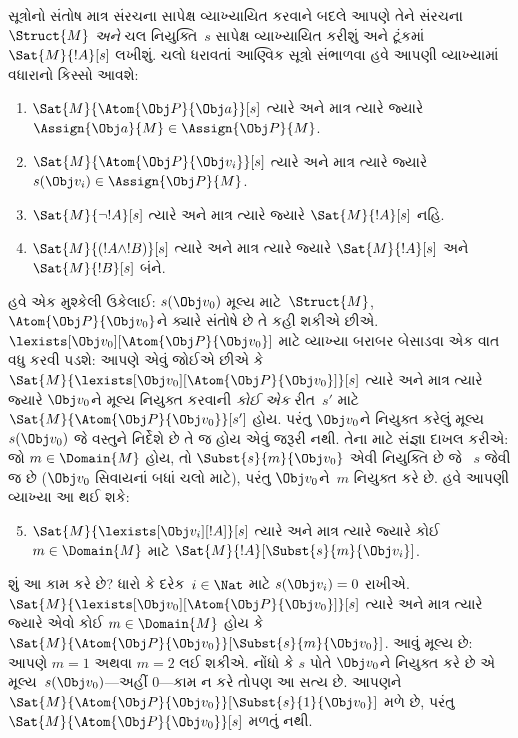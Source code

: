 સૂત્રોનો સંતોષ માત્ર સંરચના સાપેક્ષ વ્યાખ્યાયિત કરવાને
બદલે આપણે તેને સંરચના~$\Struct{M}$ \emph{અને} ચલ
નિયુક્તિ~$s$ સાપેક્ષ વ્યાખ્યાયિત કરીશું અને ટૂંકમાં
$\Sat{M}{!A}[s]$ લખીશું. ચલો ધરાવતાં આણ્વિક સૂત્રો
સંભાળવા હવે આપણી વ્યાખ્યામાં વધારાનો કિસ્સો આવશે:
\begin{enumerate}
  \item $\Sat{M}{\Atom{\Obj P}{\Obj a}}[s]$ ત્યારે અને માત્ર ત્યારે
  જ્યારે $\Assign{\Obj a}{M} \in \Assign{\Obj P}{M}$.
  \item $\Sat{M}{\Atom{\Obj P}{\Obj v_i}}[s]$ ત્યારે અને માત્ર ત્યારે
  જ્યારે $s(\Obj v_i) \in \Assign{\Obj P}{M}$.
  \item $\Sat{M}{\lnot !A}[s]$ ત્યારે અને માત્ર ત્યારે જ્યારે
  $\Sat{M}{!A}[s]$ નહિ.
  \item $\Sat{M}{(!A \land !B)}[s]$ ત્યારે અને માત્ર ત્યારે જ્યારે
  $\Sat{M}{!A}[s]$ અને $\Sat{M}{!B}[s]$ બંને.
\end{enumerate}
હવે એક મુશ્કેલી ઉકેલાઈ: $s(\Obj v_0)$ મૂલ્ય માટે~$\Struct{M}$,
$\Atom{\Obj P}{\Obj v_0}$ને ક્યારે સંતોષે છે તે કહી શકીએ છીએ.
$\lexists[\Obj v_0][\Atom{\Obj P}{\Obj v_0}]$ માટે વ્યાખ્યા બરાબર
બેસાડવા એક વાત વધુ કરવી પડશે: આપણે એવું જોઈએ છીએ કે
$\Sat{M}{\lexists[\Obj v_0][\Atom{\Obj P}{\Obj v_0}]}[s]$ ત્યારે અને
માત્ર ત્યારે જ્યારે $\Obj v_0$ને મૂલ્ય નિયુક્ત કરવાની \emph{કોઈ એક}
રીત~$s'$ માટે $\Sat{M}{\Atom{\Obj P}{\Obj v_0}}[s']$ હોય. પરંતુ
$\Obj v_0$ને નિયુક્ત કરેલું મૂલ્ય $s(\Obj v_0)$ જે વસ્તુને નિર્દેશે છે
તે જ હોય એવું જરૂરી નથી. તેના માટે સંજ્ઞા દાખલ કરીએ: જો $m \in
\Domain{M}$ હોય, તો $\Subst{s}{m}{\Obj v_0}$ એવી નિયુક્તિ છે જે
~$s$ જેવી જ છે ($\Obj v_0$ સિવાયનાં બધાં ચલો માટે), પરંતુ
$\Obj v_0$ને~$m$ નિયુક્ત કરે છે. હવે આપણી વ્યાખ્યા આ થઈ શકે:
\begin{enumerate}\setcounter{enumi}{4}
  \item $\Sat{M}{\lexists[\Obj v_i][!A]}[s]$ ત્યારે અને માત્ર ત્યારે
  જ્યારે કોઈ~$m \in \Domain{M}$ માટે
  $\Sat{M}{!A}[\Subst{s}{m}{\Obj v_i}]$.
\end{enumerate}
શું આ કામ કરે છે? ધારો કે દરેક~$i \in \Nat$ માટે $s(\Obj v_i) = 0$
રાખીએ. $\Sat{M}{\lexists[\Obj v_0][\Atom{\Obj P}{\Obj v_0}]}[s]$
ત્યારે અને માત્ર ત્યારે જ્યારે એવો કોઈ $m \in \Domain{M}$ હોય કે
$\Sat{M}{\Atom{\Obj P}{\Obj v_0}}[\Subst{s}{m}{\Obj v_0}]$. આવું
મૂલ્ય છે: આપણે $m = 1$ અથવા $m = 2$ લઈ શકીએ. નોંધો કે $s$ પોતે
$\Obj v_0$ને નિયુક્ત કરે છે એ મૂલ્ય~$s(\Obj v_0)$---અહીં $0$---કામ ન
કરે તોપણ આ સત્ય છે. આપણને $\Sat{M}{\Atom{\Obj P}{\Obj
v_0}}[\Subst{s}{1}{\Obj v_0}]$ મળે છે, પરંતુ
$\Sat{M}{\Atom{\Obj P}{\Obj v_0}}[s]$ મળતું નથી.


